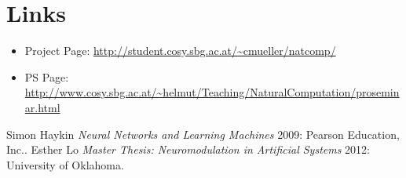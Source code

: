 \documentclass[12pt,fleqn,a4paper]{article}
\begin{document}
\newpage
\section{Links}

\begin{itemize}
\item Project Page: \url{http://student.cosy.sbg.ac.at/~cmueller/natcomp/}
\item PS Page: \url{http://www.cosy.sbg.ac.at/~helmut/Teaching/NaturalComputation/proseminar.html}
\end{itemize}


\begin{thebibliography}{1}
Simon Haykin {\em Neural Networks and Learning Machines} 2009: Pearson Education, Inc..
Esther Lo {\em Master Thesis: Neuromodulation in Artificial Systems} 2012: University of Oklahoma.
\end{thebibliography}
\end{document}
